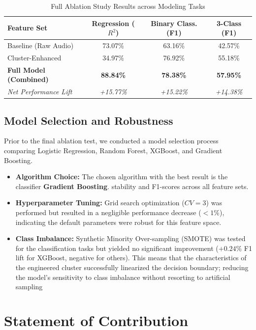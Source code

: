\documentclass{article}
\begin{document}
\begin{table}[h]
\centering
\caption{Full Ablation Study Results across Modeling Tasks}
\label{tab:ablation_full}
\begin{tabular}{lccc}
\toprule
\textbf{Feature Set} & \textbf{Regression ($R^2$)} & \textbf{Binary Class. (F1)} & \textbf{3-Class (F1)} \\
\midrule
Baseline (Raw Audio) & 73.07\% & 63.16\% & 42.57\% \\
Cluster-Enhanced & 34.97\% & 76.92\% & 55.18\% \\
\textbf{Full Model (Combined)} & \textbf{88.84\%} & \textbf{78.38\%} & \textbf{57.95\%} \\
\midrule
\textit{Net Performance Lift} & \textit{+15.77\%} & \textit{+15.22\%} & \textit{+14.38\%} \\
\bottomrule
\end{tabular}
\end{table}

\subsection*{Model Selection and Robustness}
Prior to the final ablation test, we conducted a model selection process comparing Logistic Regression, Random Forest, XGBoost, and Gradient Boosting.
\begin{itemize}
    \item \textbf{Algorithm Choice:} The chosen algorithm with the best result is the classifier \textbf{Gradient Boosting}. stability and F1-scores across all feature sets.
    \item \textbf{Hyperparameter Tuning:} Grid search optimization ($CV=3$) was performed but resulted in a negligible performance decrease ($<1\%$), indicating the default parameters were robust for this feature space.
    \item \textbf{Class Imbalance:} Synthetic Minority Over-sampling (SMOTE) was tested for the classification tasks but yielded no significant improvement ($+0.24\%$ F1 lift for XGBoost, negative for others). This means that the characteristics of the engineered cluster successfully linearized the decision boundary; reducing the model's sensitivity to class imbalance without resorting to artificial sampling
\end{itemize}

\newpage
\section*{Statement of Contribution}
\end{document}
